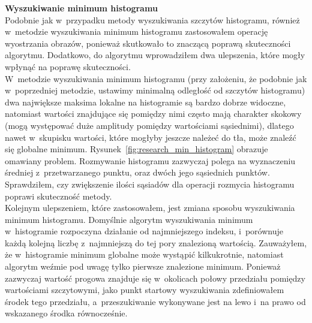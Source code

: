 \textbf{Wyszukiwanie minimum histogramu}\\
Podobnie jak w~przypadku metody wyszukiwania szczytów histogramu, również w~metodzie wyszukiwania minimum histogramu zastosowałem operację wyostrzania obrazów, ponieważ skutkowało to znaczącą poprawą skuteczności algorytmu. Dodatkowo, do algorytmu wprowadziłem dwa ulepszenia, które mogły wpłynąć na poprawę skuteczności.\\
 W~metodzie wyszukiwania minimum histogramu (przy założeniu, że podobnie jak w~poprzedniej metodzie, ustawimy minimalną odległość od szczytów histogramu) dwa największe maksima lokalne na histogramie są bardzo dobrze widoczne, natomiast wartości znajdujące się pomiędzy nimi często mają charakter skokowy (mogą występować duże amplitudy pomiędzy wartościami sąsiednimi), dlatego nawet w~skupisku wartości, które mogłyby jeszcze należeć do tła, może znaleźć się globalne minimum. Rysunek~\ref{fig:research_min_histogram} obrazuje omawiany problem. Rozmywanie histogramu zazwyczaj polega na wyznaczeniu średniej z~przetwarzanego punktu, oraz dwóch jego sąsiednich punktów. Sprawdziłem, czy zwiększenie ilości sąsiadów dla operacji rozmycia histogramu poprawi skuteczność metody.\\
Kolejnym ulepszeniem, które zastosowałem, jest zmiana sposobu wyszukiwania minimum histogramu. Domyślnie algorytm wyszukiwania minimum w~histogramie rozpoczyna działanie od najmniejszego indeksu, i~porównuje każdą kolejną liczbę z~najmniejszą do tej pory znalezioną wartością. Zauważyłem, że w~histogramie minimum globalne może wystąpić kilkukrotnie, natomiast algorytm weźmie pod uwagę tylko pierwsze znalezione minimum. Ponieważ zazwyczaj wartość progowa znajduje się w~okolicach połowy przedziału pomiędzy wartościami szczytowymi, jako punkt startowy wyszukiwania zdefiniowałem środek tego przedziału, a~przeszukiwanie wykonywane jest na lewo i~na prawo od wskazanego środka równocześnie.\\

